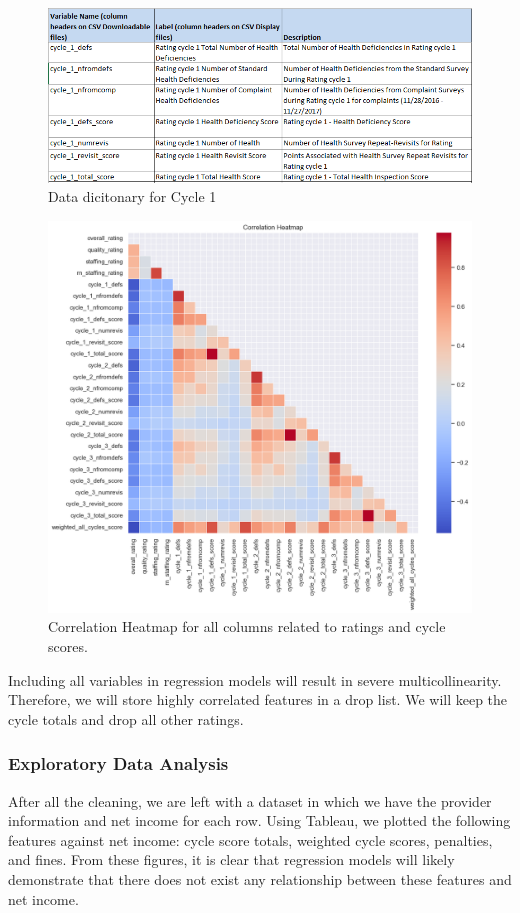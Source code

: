 \documentclass{article}
\theoremstyle{mytheoremstyle}
\theoremstyle{mytheoremstyle}
\theoremstyle{myproblemstyle}
\begin{document}
\begin{figure}[htbp]
\centering
\includegraphics[width=0.8\linewidth]{Images/multicolin.png}
\caption{Data dicitonary for Cycle 1}
\label{fig:Multicolin Results}
\end{figure}

\pagebreak
\begin{figure}[htbp]
\centering
\includegraphics[width=0.8\linewidth]{Images/multicolinheat.png}
\caption{Correlation Heatmap for all columns related to ratings and cycle scores.}
\label{fig:Correl Heatmap}
\end{figure}

Including all variables in regression models will result in severe multicollinearity. Therefore, we will store highly correlated features in a drop list. We will keep the cycle totals and drop all other ratings.

\subsubsection{Exploratory Data Analysis}
After all the cleaning, we are left with a dataset in which we have the provider information and net income for each row. Using Tableau, we plotted the following features against net income: cycle score totals, weighted cycle scores, penalties, and fines. From these figures, it is clear that regression models will likely demonstrate that there does not exist any relationship between these features and net income.
\end{document}

